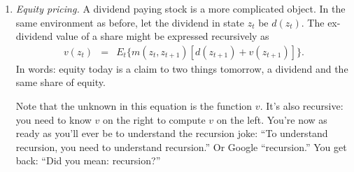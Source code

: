 \documentclass[11pt]{article}
\begin{document}
\begin{enumerate}
\begin{comment}
Another class of tractable models is based on finite-state Markov chains:
$z_t$ takes on a finite number of values, say $i = 1,\ldots, I$.
Then the function $q^n(z_t)$ is a vector, say $q^n$,
with one element for every state.
By tradition, we collect the conditional (``transition'') probabilities
in a matrix $P = [p_{ij}]$,
where $p_{ij}$ is the probability that $z_{t+1} = j$ given that $z_t = i$.
Similarly, the pricing kernel is a matrix of elements $[m_{ij}]$.

In this setting, a one-period bond price in state $i$ is
\begin{eqnarray*}
    q^1_i &=& \sum_j p_{ij} m_{ij} .
\end{eqnarray*}
If we define the matrix $B = [b_{ij}] = [p_{ij} m_{ij}]$,
then in matrix terms, the one-period bond price function/vector is
\begin{eqnarray*}
    q^1 &=& B q^0 ,
\end{eqnarray*}
where $q^0$ is a vector of ones ---
the prices of 0-maturity bonds, namely one.
 Other bond prices follow recursively:
\begin{eqnarray*}
    q^{n+1} &=& B q^n .
\end{eqnarray*}
You should convince yourself that this is (\ref{eq:recursion-bond})
applied to this environment.
If we substitute, we see that $q^n = B^n q^0 $, so anything we know
about powers of positive matrices can be put to work.
\end{comment}

\item {\it Equity pricing.\/}
A dividend paying stock is a more complicated object.
In the same environment as before, let the dividend in state $z_t$ be $d(z_t)$.
The ex-dividend value of a share might be expressed recursively as
\begin{eqnarray}
    v(z_t) &=& E_t \big\{ m(z_t,z_{t+1}) [d(z_{t+1}) + v(z_{t+1})] \big\} .
    \label{eq:recursion-equity}
\end{eqnarray}
In words:  equity today is a claim to two things tomorrow,
a dividend and the same share of equity.

Note that the unknown in this equation is the function $v$.
It's also recursive:  you need to know $v$ on the right to compute $v$ on the left.
You're now as ready as you'll ever be to understand the recursion joke:
``To understand recursion, you need to understand recursion.''
Or Google ``recursion.'' You get back:  ``Did you mean: recursion?''


\end{enumerate}
\end{document}

